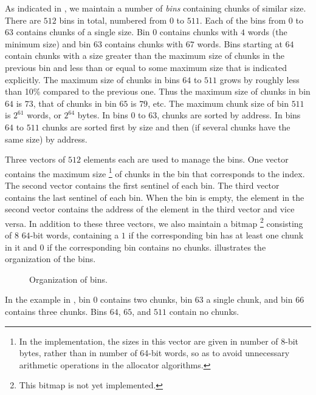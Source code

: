 As indicated in
, we maintain
a number of \emph{bins} containing chunks of similar size.  There are
$512$ bins in total, numbered from $0$ to $511$.  Each of the bins
from $0$ to $63$ contains chunks of a single size.  Bin $0$
contains chunks with $4$ words (the minimum size) and bin $63$
contains chunks with $67$ words.  Bins starting at $64$ contain chunks
with a size greater than the maximum size of chunks in the previous
bin and less than or equal to some maximum size that is indicated
explicitly.  The maximum size of chunks in bins $64$ to $511$ grows by
roughly less than 10\% compared to the previous one.  Thus the maximum
size of chunks in bin $64$ is $73$, that of chunks in bin $65$ is
$79$, etc.  The maximum chunk size of bin $511$ is $2^{61}$ words, or
$2^{64}$ bytes.  In bins $0$ to $63$, chunks are sorted by address.
In bins $64$ to $511$ chunks are sorted first by size and then (if
several chunks have the same size) by address.%

Three vectors of $512$ elements each are used to manage the bins.  One
vector contains the maximum size%
\footnote{In the implementation, the sizes in this vector are given in
  number of 8-bit bytes, rather than in number of 64-bit words, so as
  to avoid unnecessary arithmetic operations in the allocator
  algorithms.}  of chunks in the bin that corresponds to the index.
The second vector contains the first sentinel of each bin.  The third
vector contains the last sentinel of each bin.  When the bin is empty,
the element in the second vector contains the address of the element
in the third vector and vice versa.  In addition to these three
vectors, we also maintain a bitmap%
\footnote{This bitmap is not yet implemented.}  consisting of $8$
$64$-bit words, containing a $1$ if the corresponding bin has at least
one chunk in it and $0$ if the corresponding bin contains no chunks.
 illustrates the organization of the bins.

\begin{figure}
\begin{center}
\end{center}
\caption{\label{fig-bins}
Organization of bins.}
\end{figure}

In the example in , bin $0$ contains two chunks, bin
$63$ a single chunk, and bin $66$ contains three chunks.  Bins $64$,
$65$, and $511$ contain no chunks.

